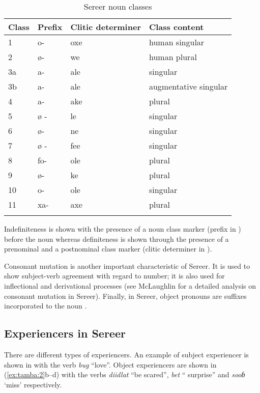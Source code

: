 \documentclass[output=paper]{langscibook}
\begin{document}
\begin{table}
\caption{\label{tab:tamba:1}Sereer noun classes}

\begin{tabular}{llll}
\lsptoprule 
Class & Prefix & Clitic determiner & Class content\\\midrule
1 & o- & oxe & human singular\\
2 & ø{}- & we & human plural\\
3a & a- & ale & singular\\
3b & a- & ale & augmentative singular\\
4 & a- & ake & plural\\
5 & ø - & le & singular\\
6 & ø- & ne & singular\\
7 & ø - & fee & singular\\
8 & fo- & ole & plural\\
9 & ø- & ke & plural\\
10 & o- & ole & singular\\
11 & xa- & axe & plural\\
\lspbottomrule
\end{tabular}
\end{table}


  Indefiniteness is shown with the presence of a noun class marker (prefix in ) before the noun whereas definiteness is shown through the presence of a prenominal and a postnominal class marker (clitic determiner in ). 

  Consonant mutation is another important characteristic of Sereer. It is used to show subject-verb  agreement with regard to number; it is also used for inflectional and derivational processes (see McLaughlin for a detailed analysis on consonant mutation in Sereer). Finally, in Sereer, object pronouns are suffixes incorporated to the noun \citep{BaierTA}.

\subsection{Experiencers in Sereer}

There are different types of experiencers. An example of subject experiencer is shown in  with the verb \textit{bug} “love”. Object experiencers are shown in (\ref{ex:tamba:2}b--d) with the verbs \textit{diidlat} “be scared”, \textit{bet} “ surprise” and \textit{sooɓ}  ‘miss’  respectively.
\end{document}
